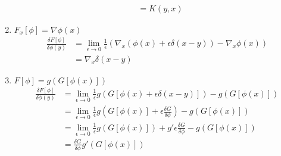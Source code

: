 \documentclass[10pt,a4paper]{article}
\theoremstyle{definition}
\begin{document}
\begin{enumerate}
\begin{align}
           &=K(y,x)
    \end{align}
    \item $F_x[\phi]=\nabla\phi(x)$
    \begin{align}
        \frac{\delta F[\phi]}{\delta\phi(y)}
        &=\lim_{\epsilon\rightarrow0}\frac{1}{\epsilon}\left( \nabla_x(\phi(x)+\epsilon\delta(x-y)) - \nabla_x\phi(x)\right)\\
        &=\nabla_x\delta(x-y)
    \end{align}
    \item $F[\phi]=g\left(G[\phi(x)]\right)$
    \begin{align}
        \frac{\delta F[\phi]}{\delta\phi(y)}
        &=\lim_{\epsilon\rightarrow0}\frac{1}{\epsilon}g(G[\phi(x)+\epsilon\delta(x-y)])-g(G[\phi(x)])\\
        &=\lim_{\epsilon\rightarrow0}\frac{1}{\epsilon}g(G[\phi(x)]+\epsilon\frac{\delta G}{\delta \phi})-g(G[\phi(x)])\\
        &=\lim_{\epsilon\rightarrow0}\frac{1}{\epsilon}g(G[\phi(x)])+g' \epsilon\frac{\delta G}{\delta \phi}-g(G[\phi(x)])\\
        &=\frac{\delta G}{\delta \phi}g'(G[\phi(x)])
    \end{align}
    
\end{enumerate}
\end{document}
